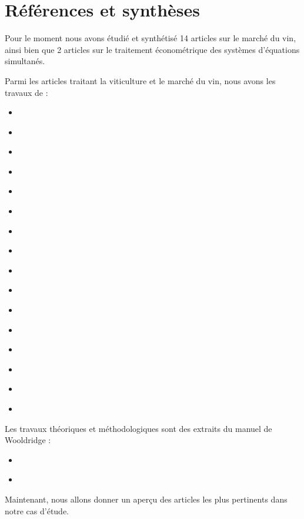 \documentclass[11pt, a4paper]{article}
\begin{document}
\section*{Références et synthèses}
Pour le moment nous avons étudié et synthétisé 14 articles sur le marché du vin, ainsi bien que 2 articles sur le traitement économétrique des systèmes d'équations simultanés. 
\par
Parmi les articles traitant la viticulture et le marché du vin, nous avons les travaux de :
\begin{itemize}
    \item \citet*{rebelo2019}
    \item \citet*{anderson2018s}
    \item \citet*{bazen2018}
    \item \citet*{garcia2016}
    \item \citet*{cembalo2014}
    \item \citet*{outreville2010}
    \item \citet*{benfratello2009}
    \item \citet*{davis2008}
    \item \citet*{christophe2008}
    \item \citet*{costanigro2007}
    \item \citet*{steiner2004}
    \item \citet*{soler2002}
    \item \citet*{giraud2001}
    \item \citet*{gergaud1998}
    \item \citet*{labys1976}
    \item \citet*{daillens1962}
\end{itemize}
Les travaux théoriques et méthodologiques sont des extraits du manuel de Wooldridge :
\begin{itemize}
    \item \citet*{wooldridge2016introductory}
    \item \citet*{wooldridgepanel}
\end{itemize}
\par
Maintenant, nous allons donner un aperçu des articles les plus pertinents dans notre cas d'étude.
\end{document}
